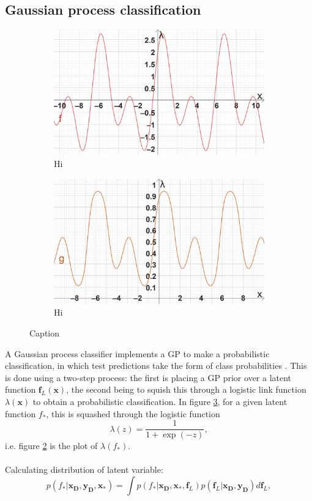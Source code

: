 \documentclass{article}
\newcommand{\inputVec}{\mathbf{x}}
\newcommand{\outputVec}{\mathbf{y}}
\newcommand{\designInput}{\inputVec_\design}
\newcommand{\designOutput}{\outputVec_\design}
\newcommand{\design}{\mathbf{D}}
\newcommand{\latent}{\mathbf{f}_L}
\begin{document}
\subsection{Gaussian process classification}
\label{section:GPC}
\begin{figure}
    \centering
    \begin{subfigure}{}
        \includegraphics[width=0.45\linewidth]{GPC-explainer/latent-func.png}
        \caption{Hi}
        \label{fig:latent-func}
    \end{subfigure}
    
    \begin{subfigure}{}
        \includegraphics[width=0.45\linewidth]{GPC-explainer/posterior.png}
        \caption{Hi}
        \label{fig:posterior}
    \end{subfigure}
    \caption{Caption}
    \label{fig:GPC-explainer}
\end{figure}
A Gaussian process classifier implements a GP to make a probabilistic classification, in which test predictions take the form of class probabilities \citep{scikit-learn}. This is done using a two-step process: the first is placing a GP prior over a latent function $\latent(\inputVec)$, the second being to squish this through a logistic link function $\lambda(\inputVec)$ to obtain a probabilistic classification. In figure \ref{fig:GPC-explainer}, for a given latent function $f_*$, this is squashed through the logistic function \[\lambda(z) = \frac{1}{1+\exp(-z)}, \] i.e. figure \ref{fig:posterior} is the plot of $\lambda(f_*)$.\\\\
Calculating distribution of latent variable:
\begin{equation}
    p(f_*|\designInput,\designOutput,\inputVec_*) = \int p(f_*|\designInput,\inputVec_*,\latent) p(\latent|\designInput,\designOutput) d \latent,
\end{equation}
\end{document}
